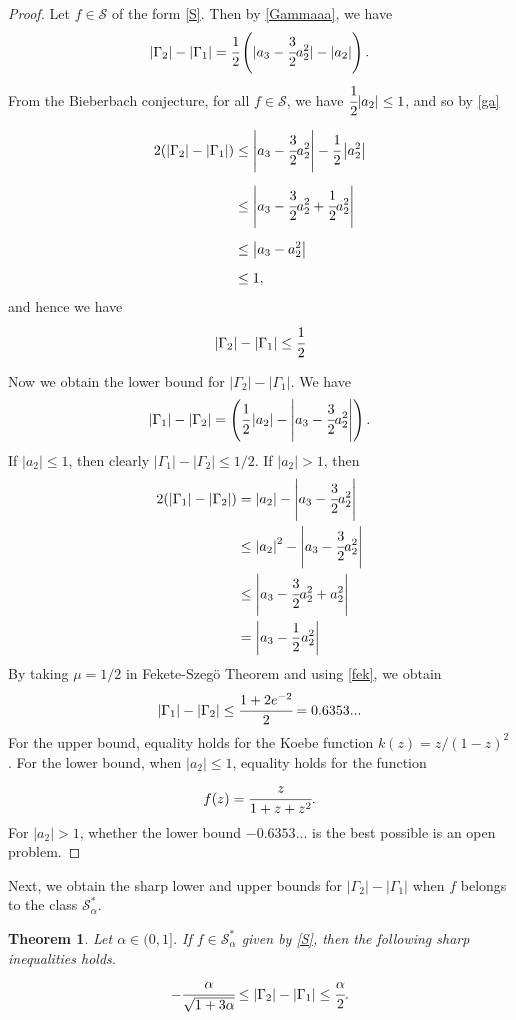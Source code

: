 \documentclass[a4paper,12pt]{amsart}
\newtheorem{theorem}{Theorem}[section]
\theoremstyle{definition}
\numberwithin{equation}{section}
\begin{document}
 \begin{proof}
 Let $f \in \mathcal{S}$ of the form \eqref{S}. Then by \eqref{Gammaaa}, we have
\begin{equation}\label{ga}
|\Gamma_2|-|\Gamma_1|=\cfrac{1}{2}\left(|a_3-\cfrac{3}{2}a_2^2|-|a_2|\right).
\end{equation}
From the Bieberbach conjecture, for all $f \in \mathcal{S}$, we have $\cfrac{1}{2}|a_2| \leq 1$, and so by \eqref{ga}

\begin{equation}
\begin{aligned}
2(|\Gamma_2|-|\Gamma_1|)&\leq \left|a_3-\cfrac{3}{2}a_2^2\right|-\cfrac{1}{2}\left|a_2^2\right|\\[2mm]
&\leq \left| a_3-\cfrac{3}{2}a_2^2+\cfrac{1}{2}a_2^2 \right| \\[2mm]
&\leq \left| a_3-a_2^2\right|\\[2mm]
&\leq 1,
\end{aligned}
\end{equation}
and hence we have
$$
|\Gamma_2|-|\Gamma_1| \leq \cfrac{1}{2}
$$

\noindent Now we obtain the lower bound for $|\Gamma_2|-|\Gamma_1|$.
We have 
$$
|\Gamma_1|-|\Gamma_2| = \left(\cfrac{1}{2}\left|a_2\right|-\left|a_3-\cfrac{3}{2}a_2^2\right|\right).
$$
If $|a_2|\leq 1$, then clearly $|\Gamma_1|-|\Gamma_2| \leq 1/2$. If $|a_2|> 1$, then
\begin{equation}\label{fek}
\begin{aligned}
2(|\Gamma_1|-|\Gamma_2|) &= \left|a_2\right|-\left|a_3-\cfrac{3}{2}a_2^2\right|\\
&\leq \left|a_2\right|^2-\left|a_3-\cfrac{3}{2}a_2^2\right|\\
&\leq \left| a_3-\cfrac{3}{2}a_2^2+a_2^2\right|\\
&=\left| a_3-\frac{1}{2}a_2^2\right|
\end{aligned}
\end{equation}
By taking $\mu=1/2$ in Fekete-Szegö Theorem and using \eqref{fek}, we obtain 
$$
|\Gamma_1|-|\Gamma_2|\leq  \cfrac{1+2e^{-2}}{2}=0.6353...
$$
For the upper bound, equality holds for the Koebe function $k(z)=z/(1-z)^2$. For the lower bound, when $|a_2|\leq 1$, equality holds for the function
$$
f(z)=\cfrac{z}{1+z+z^2}.
$$
For $|a_2| > 1$, whether the lower bound $-0.6353...$ is
the best possible is an open problem.


 \end{proof}
\noindent Next, we obtain the sharp lower and upper bounds for $|\Gamma_2|-|\Gamma_1|$ when $f$ belongs to the class  $\mathcal{S}^*_{\alpha}$.
\begin{theorem}\label{thmm}
Let $\alpha \in (0,1]$. If $f\in\mathcal{S}^*_{\alpha}$ given by \eqref{S}, then the following sharp inequalities holds.
\begin{equation}\label{thm2}
-\cfrac{\alpha}{\sqrt{1+3\alpha}}\leq |\Gamma_2|-|\Gamma_1| \leq \cfrac{\alpha}{2}.
\end{equation}

\end{theorem}
\end{document}
